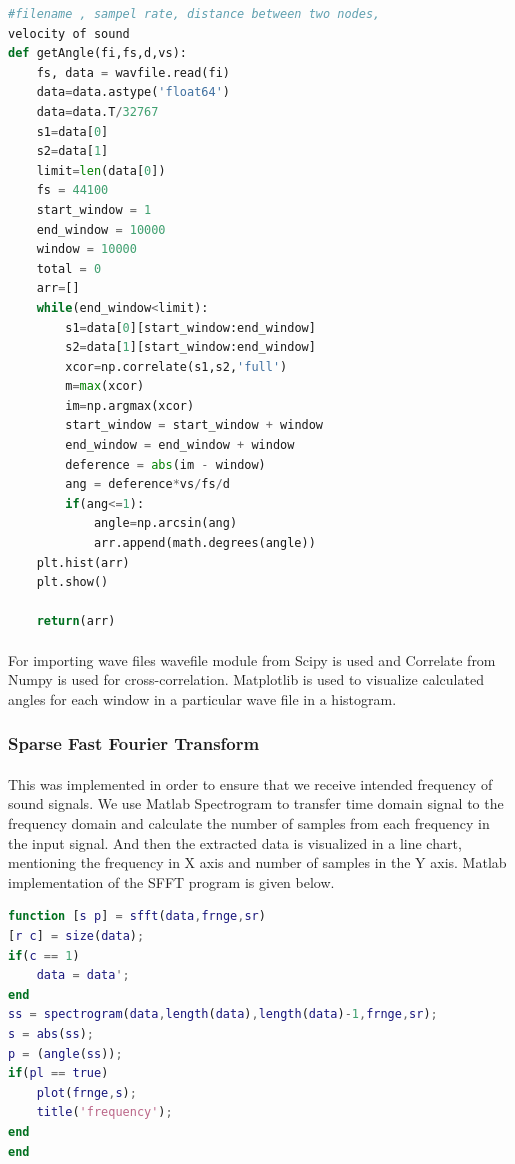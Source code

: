 \documentclass[12pt]{article}
\numberwithin{figure}{section}
\numberwithin{table}{section}
\begin{document}
\begin{lstlisting}[language=Python]
#filename , sampel rate, distance between two nodes, 
velocity of sound
def getAngle(fi,fs,d,vs):   
    fs, data = wavfile.read(fi)
    data=data.astype('float64')
    data=data.T/32767
    s1=data[0]
    s2=data[1]
    limit=len(data[0])
    fs = 44100
    start_window = 1
    end_window = 10000
    window = 10000
    total = 0
    arr=[]
    while(end_window<limit):
        s1=data[0][start_window:end_window]
        s2=data[1][start_window:end_window]
        xcor=np.correlate(s1,s2,'full')
        m=max(xcor)
        im=np.argmax(xcor)
        start_window = start_window + window
        end_window = end_window + window
        deference = abs(im - window)
        ang = deference*vs/fs/d
        if(ang<=1):
            angle=np.arcsin(ang)
            arr.append(math.degrees(angle))
    plt.hist(arr)
    plt.show()

    return(arr)
\end{lstlisting}

\paragraph{}
For importing wave files wavefile module from Scipy is used and Correlate from Numpy is used for cross-correlation. Matplotlib is used to visualize calculated angles for each window in a particular wave file in a histogram. 

\subsubsection{Sparse Fast Fourier Transform}
\paragraph{}
This was implemented in order to ensure that we receive intended frequency of sound signals. We use Matlab Spectrogram to transfer time domain signal to the frequency domain and calculate the number of samples from each frequency in the input signal. And then the extracted data is visualized in a line chart, mentioning the frequency in X axis and number of samples in the Y axis. Matlab implementation of the SFFT program is given below.

\begin{lstlisting}[language=Matlab]
function [s p] = sfft(data,frnge,sr)
[r c] = size(data);
if(c == 1)
    data = data';
end
ss = spectrogram(data,length(data),length(data)-1,frnge,sr);
s = abs(ss);
p = (angle(ss));
if(pl == true)
    plot(frnge,s);
    title('frequency');
end
end
\end{lstlisting}
\end{document}
